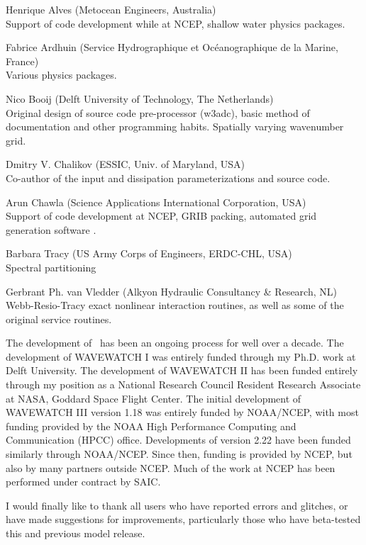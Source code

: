 \begin{list}{\ldots}{ }
\item [Henrique Alves] (Metocean Engineers, Australia) \\
Support of code development while at NCEP, shallow water physics packages.
\item [Fabrice Ardhuin] (Service Hydrographique et Oc\'{e}anographique de la
Marine, France) \\
Various  physics packages.
\item [Nico Booij] (Delft University of Technology, The Netherlands) \\
Original design of source code pre-processor ({\code w3adc}), basic method of
documentation and other programming habits. Spatially varying wavenumber grid.
\item [Dmitry V. Chalikov] (ESSIC, Univ. of Maryland, USA) \\ Co-author of the
\cite{tol:JPO96} input and dissipation parameterizations and source code.
\item [Arun Chawla](Science Applications International Corporation, USA) \\
Support of code development at NCEP, GRIB packing, automated grid generation
software \citep{tol:MMAB07a, tol:OMOD08a}.
\item [Barbara Tracy] (US Army Corps of Engineers, ERDC-CHL, USA) \\
Spectral partitioning
\item [Gerbrant Ph. van Vledder] (Alkyon Hydraulic Consultancy \& Research,
NL) \\ 
Webb-Resio-Tracy exact nonlinear interaction routines, as well as some of the
original service routines.
\end{list}

\noindent
The development of \ww\ has been an ongoing process for well over a
decade. The development of WAVEWATCH I was entirely funded through my
Ph.D. work at Delft University. The development of WAVEWATCH II has been
funded entirely through my position as a National Research Council Resident
Research Associate at NASA, Goddard Space Flight Center. The initial
development of WAVEWATCH III version 1.18 was entirely funded by NOAA/NCEP,
with most funding provided by the NOAA High Performance Computing and
Communication (HPCC) office. Developments of version 2.22 have been funded
similarly through NOAA/NCEP. Since then, funding is provided by NCEP, but also
by many partners outside NCEP. Much of the work at NCEP has been performed
under contract by SAIC.

I would finally like to thank all users who have reported errors and glitches,
or have made suggestions for improvements, particularly those who have
beta-tested this and previous model release.

